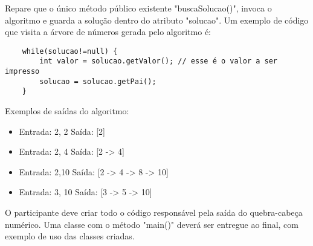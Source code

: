 Repare que o único método público existente "buscaSolucao()", invoca o algoritmo e guarda a solução
dentro do atributo "solucao". Um exemplo de código que visita a árvore de números gerada pelo algoritmo é:

\begin{lstlisting}
	while(solucao!=null) {
		int valor = solucao.getValor(); // esse é o valor a ser impresso
		solucao = solucao.getPai();
	}
\end{lstlisting}

Exemplos de saídas do algoritmo:

\begin{itemize}
	\item Entrada: 2, 2 Saída: [2]
	\item Entrada: 2, 4 Saída: [2 -> 4]
	\item Entrada: 2,10 Saída: [2 -> 4 -> 8 -> 10]
	\item Entrada: 3, 10 Saída: [3 -> 5 -> 10]
\end{itemize}

O participante deve criar todo o código responsável pela saída do quebra-cabeça numérico. Uma classe com
o método "main()" deverá ser entregue ao final, com exemplo de uso das classes criadas.


